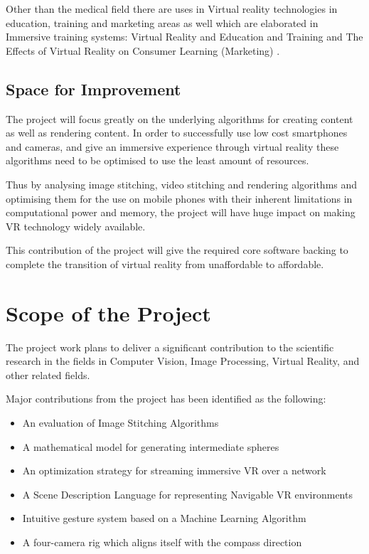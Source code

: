 Other than the medical field there are uses in Virtual reality technologies in education, training and marketing areas as well which are elaborated in Immersive training systems: Virtual Reality and Education and Training \cite{12} and  The Effects of Virtual Reality on Consumer Learning (Marketing) \cite{13}.

\subsection{Space for Improvement}
\label{intro_subsec:2_3}

The project will focus greatly on the underlying algorithms for creating content as well as rendering content. In order to successfully use low cost smartphones and cameras, and give an immersive experience through virtual reality these algorithms need to be optimised to use the least amount of resources.

Thus by analysing image stitching, video stitching and rendering algorithms and optimising them for the use on mobile phones with their inherent limitations in computational power and memory, the project will have huge impact on making VR technology widely available.

This contribution of the project will give the required core software backing to complete the transition of virtual reality from unaffordable to affordable.

\section{Scope of the Project}
\label{intro_sec:3}

The project work plans to deliver a significant contribution to the scientific research in the fields in Computer Vision, Image Processing, Virtual Reality, and other related fields.

Major contributions from the project has been identified as the following:

\begin{itemize}
\item{An evaluation of Image Stitching Algorithms}
\item{A mathematical model for generating intermediate spheres}
\item{An optimization strategy for streaming immersive VR over a network}
\item{A Scene Description Language for representing Navigable VR environments}
\item{Intuitive gesture system based on a Machine Learning Algorithm}
\item{A four-camera rig which aligns itself with the compass direction}
\end{itemize}

